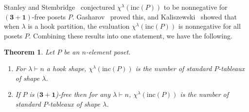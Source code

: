 \documentclass[12pt]{amsart}
\newtheorem{thm}{Theorem}[section]
\newtheorem{prop}[thm]{Proposition}
\numberwithin{equation}{section}
\newcommand{\sn}{\mathfrak{S}_n}
\newcommand{\qsn}{\mathbb{Q}[\sn]}
\newcommand{\wtc}[2]{\widetilde{C}_{#1}(#2)}
\newcommand{\tr}{{\negthickspace \top \negthickspace}}
\newcommand{\inc}{\mathrm{inc}}
\begin{document}
Stanley and Stembridge~\cite[Conj.\,5.1]{StanStemIJT}
conjectured $\chi^\lambda(\inc(P))$ to be nonnegative
for $(\mathbf3 + \mathbf 1)$-free posets $P$.
Gasharov~\cite{GashInc} proved this,
and Kaliszewski~\cite[Prop.\ 4.3]{KaliHook}
showed that when $\lambda$ is a hook partition,
the evaluation $\chi^\lambda(\inc(P))$
is nonnegative for all posets $P$.
Combining these results into one statement, we have the
following.
\begin{thm}\label{t:KaliGash}
  Let $P$ be an $n$-element poset.
  \begin{enumerate}
  \item For $\lambda \vdash n$ a hook shape,
      $\chi^\lambda(\inc(P))$ is the number of
      standard $P$-tableaux of shape $\lambda$.
  \item %
      If $P$ is $(\mathbf3+\mathbf1$)-free then for any
      $\lambda \vdash n$,
      $\chi^\lambda(\inc(P))$ is the number of
      standard $P$-tableaux of shape $\lambda$.
  \end{enumerate}
  \end{thm}
    
\end{document}
